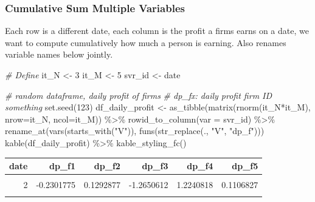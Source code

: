 \documentclass[
]{book}
\newenvironment{Shaded}{\begin{snugshade}}{\end{snugshade}}
\newcommand{\AttributeTok}[1]{\textcolor[rgb]{0.77,0.63,0.00}{#1}}
\newcommand{\CommentTok}[1]{\textcolor[rgb]{0.56,0.35,0.01}{\textit{#1}}}
\newcommand{\DecValTok}[1]{\textcolor[rgb]{0.00,0.00,0.81}{#1}}
\newcommand{\FunctionTok}[1]{\textcolor[rgb]{0.00,0.00,0.00}{#1}}
\newcommand{\NormalTok}[1]{#1}
\newcommand{\OtherTok}[1]{\textcolor[rgb]{0.56,0.35,0.01}{#1}}
\newcommand{\SpecialCharTok}[1]{\textcolor[rgb]{0.00,0.00,0.00}{#1}}
\newcommand{\StringTok}[1]{\textcolor[rgb]{0.31,0.60,0.02}{#1}}
\begin{document}
\hypertarget{cumulative-sum-multiple-variables}{%
\subsubsection{Cumulative Sum Multiple Variables}\label{cumulative-sum-multiple-variables}}

Each row is a different date, each column is the profit a firms earns on a date, we want to compute cumulatively how much a person is earning. Also renames variable names below jointly.

\begin{Shaded}
\begin{Highlighting}[]
\CommentTok{\# Define}
\NormalTok{it\_N }\OtherTok{\textless{}{-}} \DecValTok{3}
\NormalTok{it\_M }\OtherTok{\textless{}{-}} \DecValTok{5}
\NormalTok{svr\_id }\OtherTok{\textless{}{-}} \StringTok{\textquotesingle{}date\textquotesingle{}}

\CommentTok{\# random dataframe, daily profit of firms}
\CommentTok{\# dp\_fx: daily profit firm ID something}
\FunctionTok{set.seed}\NormalTok{(}\DecValTok{123}\NormalTok{)}
\NormalTok{df\_daily\_profit }\OtherTok{\textless{}{-}} \FunctionTok{as\_tibble}\NormalTok{(}\FunctionTok{matrix}\NormalTok{(}\FunctionTok{rnorm}\NormalTok{(it\_N}\SpecialCharTok{*}\NormalTok{it\_M), }\AttributeTok{nrow=}\NormalTok{it\_N, }\AttributeTok{ncol=}\NormalTok{it\_M)) }\SpecialCharTok{\%\textgreater{}\%}
  \FunctionTok{rowid\_to\_column}\NormalTok{(}\AttributeTok{var =}\NormalTok{ svr\_id) }\SpecialCharTok{\%\textgreater{}\%}
  \FunctionTok{rename\_at}\NormalTok{(}\FunctionTok{vars}\NormalTok{(}\FunctionTok{starts\_with}\NormalTok{(}\StringTok{"V"}\NormalTok{)),}
            \FunctionTok{funs}\NormalTok{(}\FunctionTok{str\_replace}\NormalTok{(., }\StringTok{"V"}\NormalTok{, }\StringTok{"dp\_f"}\NormalTok{)))}
\FunctionTok{kable}\NormalTok{(df\_daily\_profit) }\SpecialCharTok{\%\textgreater{}\%}
  \FunctionTok{kable\_styling\_fc}\NormalTok{()}
\end{Highlighting}
\end{Shaded}

\begin{table}[!h]
\centering
\begin{tabular}{r|r|r|r|r|r}
\hline
date & dp\_f1 & dp\_f2 & dp\_f3 & dp\_f4 & dp\_f5\\
\hline
\cellcolor{gray!6}{1} & \cellcolor{gray!6}{-0.5604756} & \cellcolor{gray!6}{0.0705084} & \cellcolor{gray!6}{0.4609162} & \cellcolor{gray!6}{-0.4456620} & \cellcolor{gray!6}{0.4007715}\\
\hline
2 & -0.2301775 & 0.1292877 & -1.2650612 & 1.2240818 & 0.1106827\\
\hline
\cellcolor{gray!6}{3} & \cellcolor{gray!6}{1.5587083} & \cellcolor{gray!6}{1.7150650} & \cellcolor{gray!6}{-0.6868529} & \cellcolor{gray!6}{0.3598138} & \cellcolor{gray!6}{-0.5558411}\\
\hline
\end{tabular}
\end{table}
\end{document}
